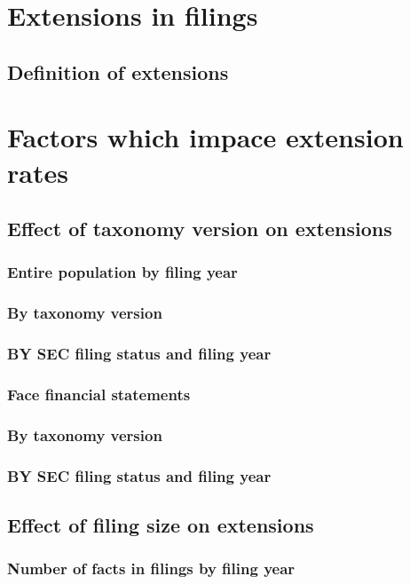 \documentclass{article}
\begin{document}
\section {Extensions in filings}
\subsection {Definition of extensions}



\section{Factors which impace extension rates}
\subsection{Effect of taxonomy version on extensions}
\subsubsection{Entire population by filing year}
\subsubsection{By taxonomy version}
\subsubsection{BY SEC filing status and filing year}

\subsubsection{Face financial statements}
\subsubsection{By taxonomy version}
\subsubsection{BY SEC filing status and filing year}

\subsection{Effect of filing size on extensions}
\subsubsection{Number of facts in filings by filing year}
\end{document}
